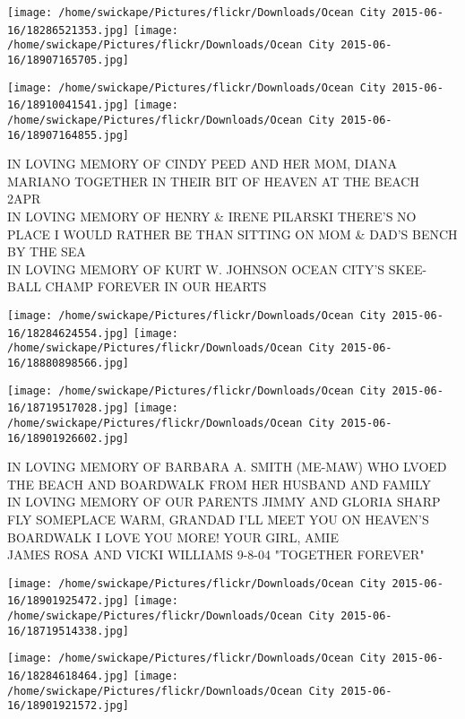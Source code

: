 \documentclass[10pt,letterpaper]{article}
\begin{document}
\texttt{[image: /home/swickape/Pictures/flickr/Downloads/Ocean City 2015-06-16/18286521353.jpg]}
\texttt{[image: /home/swickape/Pictures/flickr/Downloads/Ocean City 2015-06-16/18907165705.jpg]}

\texttt{[image: /home/swickape/Pictures/flickr/Downloads/Ocean City 2015-06-16/18910041541.jpg]}
\texttt{[image: /home/swickape/Pictures/flickr/Downloads/Ocean City 2015-06-16/18907164855.jpg]}

IN LOVING MEMORY OF CINDY PEED AND HER MOM, DIANA MARIANO TOGETHER IN THEIR BIT OF HEAVEN AT THE BEACH\\
2APR\\
IN LOVING MEMORY OF HENRY \& IRENE PILARSKI THERE'S NO PLACE I WOULD RATHER BE THAN SITTING ON MOM \& DAD'S BENCH BY THE SEA\\
IN LOVING MEMORY OF KURT W. JOHNSON OCEAN CITY'S SKEE{-}BALL CHAMP FOREVER IN OUR HEARTS\\
\pagebreak

\texttt{[image: /home/swickape/Pictures/flickr/Downloads/Ocean City 2015-06-16/18284624554.jpg]}
\texttt{[image: /home/swickape/Pictures/flickr/Downloads/Ocean City 2015-06-16/18880898566.jpg]}

\texttt{[image: /home/swickape/Pictures/flickr/Downloads/Ocean City 2015-06-16/18719517028.jpg]}
\texttt{[image: /home/swickape/Pictures/flickr/Downloads/Ocean City 2015-06-16/18901926602.jpg]}

IN LOVING MEMORY OF BARBARA A. SMITH (ME{-}MAW) WHO LVOED THE BEACH AND BOARDWALK FROM HER HUSBAND AND FAMILY\\
IN LOVING MEMORY OF OUR PARENTS JIMMY AND GLORIA SHARP\\
FLY SOMEPLACE WARM, GRANDAD I'LL MEET YOU ON HEAVEN'S BOARDWALK I LOVE YOU MORE!  YOUR GIRL, AMIE\\
JAMES ROSA AND VICKI WILLIAMS 9{-}8{-}04 "TOGETHER FOREVER"\\
\pagebreak

\texttt{[image: /home/swickape/Pictures/flickr/Downloads/Ocean City 2015-06-16/18901925472.jpg]}
\texttt{[image: /home/swickape/Pictures/flickr/Downloads/Ocean City 2015-06-16/18719514338.jpg]}

\texttt{[image: /home/swickape/Pictures/flickr/Downloads/Ocean City 2015-06-16/18284618464.jpg]}
\texttt{[image: /home/swickape/Pictures/flickr/Downloads/Ocean City 2015-06-16/18901921572.jpg]}
\end{document}
